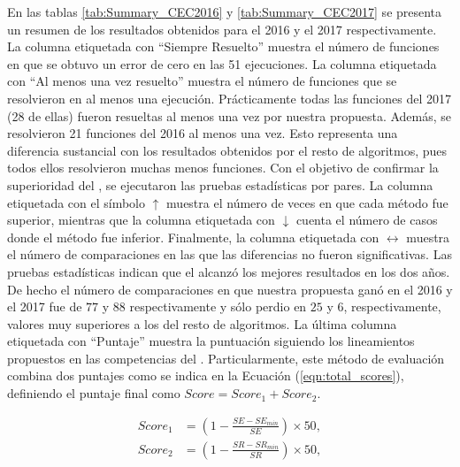 En las tablas \ref{tab:Summary_CEC2016} y \ref{tab:Summary_CEC2017} se presenta un resumen de los resultados obtenidos para el \CEC{} 2016 y el \CEC{} 2017 respectivamente.
%
La columna etiquetada con ``Siempre Resuelto'' muestra el número de funciones en que se obtuvo un error de cero en las 51 ejecuciones.
%
La columna etiquetada con ``Al menos una vez resuelto'' muestra el número de funciones que se resolvieron en al menos una ejecución.
%
Prácticamente todas las funciones del \CEC{} 2017 (28 de ellas) fueron resueltas al menos una vez por nuestra propuesta.
%
Además, se resolvieron 21 funciones del \CEC{} 2016 al menos una vez.
%
Esto representa una diferencia sustancial con los resultados obtenidos por el resto de algoritmos, pues todos ellos resolvieron muchas menos funciones.
%
Con el objetivo de confirmar la superioridad del \DEEDM{}, se ejecutaron las pruebas estadísticas por pares.
%
La columna etiquetada con el símbolo $\uparrow$ muestra el número de veces en que cada método fue superior, mientras que la columna etiquetada 
con $\downarrow$ cuenta el número de casos donde el método fue inferior.
%
Finalmente, la columna etiquetada con $\longleftrightarrow$ muestra el número de comparaciones en las que las diferencias no fueron significativas.
%
Las pruebas estadísticas indican que el \DEEDM{} alcanzó los mejores resultados en los dos años.
%
De hecho el número de comparaciones en que nuestra propuesta ganó en el \CEC{} 2016 y el \CEC{} 2017 fue de $77$ y $88$ respectivamente y
sólo perdio en $25$ y $6$, respectivamente, valores muy superiores a los del resto de algoritmos.
%
La última columna etiquetada con ``Puntaje'' muestra la puntuación siguiendo los lineamientos propuestos en las competencias del \CEC{}.
%
Particularmente, este método de evaluación combina dos puntajes como se indica en la Ecuación (\ref{eqn:total_scores}),
definiendo el puntaje final como $Score = Score_1 + Score_2$.

%
\begin{equation}\label{eqn:total_scores}
\begin{split}
Score_1 &= \left (1 - \frac{SE - SE_{min}}{SE} \right) \times 50, \\
Score_2 &= \left  (1 - \frac{SR - SR_{min}}{SR} \right ) \times 50, \\
\end{split}
\end{equation}

